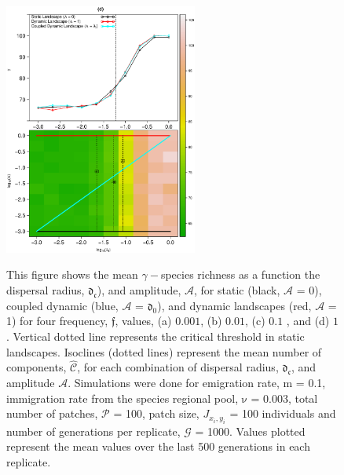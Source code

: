 \documentclass[12pt]{article}
\begin{document}
\begin{figure}[hb!]
\begin{center}
\includegraphics[width=2.5in]{./figures/new_A_r0_MeanGamma_010.eps}\\
\end{center}
\caption{This figure shows the mean $\gamma-$species
    richness as a function the dispersal radius, $\mathfrak{d_{c}}$), and amplitude, $\mathcal{A}$, for static
    (black, $\mathcal{A}$ = 0), coupled dynamic (blue, $\mathcal{A}$ =
    $\mathfrak{d_{0}}$), and dynamic landscapes (red, $\mathcal{A}$ =
    1) for four frequency, $\mathfrak{f}$, values, (a) $0.001$, (b)
    $0.01$, (c) $0.1$ , and (d) $1$. Vertical dotted line represents
    the critical threshold in static landscapes. Isoclines
    (dotted lines) represent the mean number of components,
    $\hat{\mathcal{C}}$, for each combination of dispersal radius,
    $\mathfrak{d_{c}}$, and amplitude $\mathcal{A}$. Simulations were
    done for emigration rate, $\mathrm{m}$ = 0.1, immigration rate
    from the species regional pool, $\mathrm{\nu}$ = 0.003, total
    number of patches, $\mathcal{P}$ = 100, patch size, $J_{x_i,y_i}$
    = 100 individuals and number of generations per replicate,
    $\mathcal{G}$ = 1000. Values plotted represent the mean values
    over the last 500 generations in each replicate.}
\label{fig:SI-E1}
\end{figure}
\end{document}
